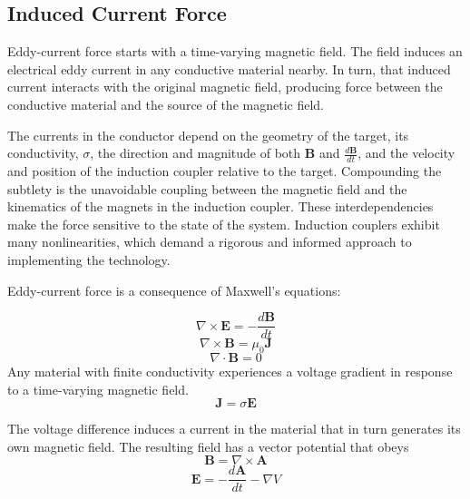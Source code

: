 \documentclass{article}
\begin{document}
\subsection{Induced Current Force}

Eddy-current force starts with a time-varying magnetic field. The field induces an electrical eddy current in any conductive material nearby. In turn, that induced current interacts with the original magnetic field, producing force between the conductive material and the source of the magnetic field.

The currents in the conductor depend on the geometry of the target, its conductivity, $\sigma$, the direction and magnitude of both \textbf{B} and $\frac{d\textbf{B}}{dt}$, and the velocity and position of the induction coupler relative to the target. Compounding the subtlety is the unavoidable coupling between the magnetic field and the kinematics of the magnets in the induction coupler. These interdependencies make the force sensitive to the state of the system. Induction couplers exhibit many nonlinearities, which demand a rigorous and informed approach to implementing the technology.

Eddy-current force is a consequence of Maxwell's equations:

\begin{equation}\label{eq:FaradayInduction}
\nabla \times \textbf{E} = -\frac{d\textbf{B}}{dt}
\end{equation}
\begin{equation}\label{eq:AmperesLaw}
\nabla \times \textbf{B} = \mu_0 \textbf{J}
\end{equation}
\begin{equation}\label{eq:GaussLaw}
\nabla \cdot \textbf{B} = 0
\end{equation}
Any material with finite conductivity experiences a voltage gradient in response to a time-varying magnetic field. 
\begin{equation}\label{eq:currentflow}
\textbf{J}=\sigma \textbf{E}
\end{equation}

The voltage difference induces a current in the material that in turn generates its own magnetic field. The resulting field has a vector potential that obeys 
\begin{equation}\label{eq:vectorPotential}
\textbf{B} = \nabla \times \textbf{A}
\end{equation}
\begin{equation} \label{eq:Efield}
\textbf{E} =  -\frac{d\textbf{A}}{dt} - \nabla V
\end{equation}
\end{document}
